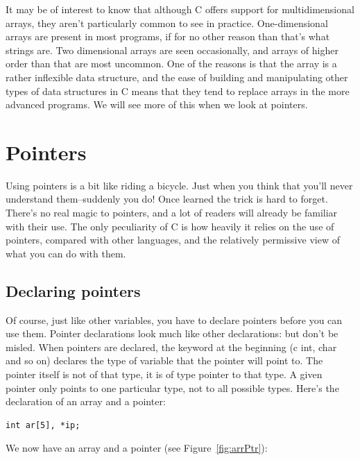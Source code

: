   It may be of interest to know that although C offers support for
    multidimensional arrays, they aren't particularly common to see in
    practice. One-dimensional arrays are present in most programs, if for no
    other reason than that's what strings are. Two dimensional arrays are
    seen occasionally, and arrays of higher order than that are most
    uncommon. One of the reasons is that the array is a rather inflexible
    data structure, and the ease of building and manipulating other types of
    data structures in C means that they tend to replace arrays in the more
    advanced programs. We will see more of this when we look at
    pointers.


  

 
        \section{Pointers}
        

  

  Using pointers is a bit like riding a bicycle. Just when you think that
   you'll never understand them--suddenly you do! Once learned the trick
   is hard to forget. There's no real magic to pointers, and a lot of
   readers will already be familiar with their use. The only peculiarity of
   C is how heavily it relies on the use of pointers, compared with other
   languages, and the relatively permissive view of what you can do with
   them.


  \subsection{Declaring pointers}
   

   Of course, just like other variables, you have to declare pointers
    before you can use them. Pointer declarations look much like other
    declarations: but don't be misled. When pointers are declared, the
    keyword at the beginning (c int, char and so on) declares the type of
    variable that the pointer will point to. The pointer itself is not of
    that type, it is of type pointer to that type. A given pointer only
    points to one particular type, not to all possible types. Here's the
    declaration of an array and a pointer:


   \begin{Verbatim}
int ar[5], *ip;
\end{Verbatim}

   We now have an array and a pointer (see Figure~\ref{fig:arrPtr}):


